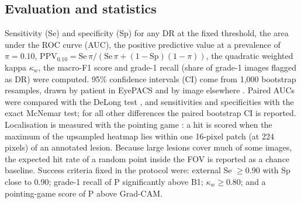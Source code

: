 \subsection{Evaluation and statistics}
Sensitivity (Se) and specificity (Sp) for any DR at the fixed threshold, the area under the ROC curve (AUC), the positive predictive value at a prevalence of $\pi=0.10$, $\mathrm{PPV}_{0.10}=\mathrm{Se}\,\pi/(\mathrm{Se}\,\pi+(1-\mathrm{Sp})(1-\pi))$, the quadratic weighted kappa $\kappa_w$, the macro-F1 score and grade-1 recall (share of grade-1 images flagged as DR) were computed. 95\% confidence intervals (CI) come from 1{,}000 bootstrap resamples, drawn by patient in EyePACS and by image elsewhere \cite{efron1993}. Paired AUCs were compared with the DeLong test \cite{delong1988}, and sensitivities and specificities with the exact McNemar test; for all other differences the paired bootstrap CI is reported. Localisation is measured with the pointing game \cite{zhang2018}: a hit is scored when the maximum of the upsampled heatmap lies within one 16-pixel patch (at 224 pixels) of an annotated lesion. Because large lesions cover much of some images, the expected hit rate of a random point inside the FOV is reported as a chance baseline. Success criteria fixed in the protocol were: external Se $\geq0.90$ with Sp close to 0.90; grade-1 recall of P significantly above B1; $\kappa_w\geq0.80$; and a pointing-game score of P above Grad-CAM.
